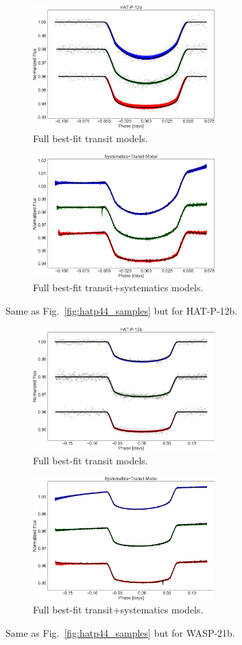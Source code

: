 \begin{figure}
\centering
\begin{subfigure}{.5\textwidth}
\includegraphics[width=7cm]{hatp12/1000_posterior_samples.png}
\caption{Full best-fit transit models.}
\end{subfigure}%
\begin{subfigure}{.5\textwidth}
\includegraphics[width=7cm]{hatp12/transit_with_sys.png}
\caption{Full best-fit transit+systematics models.}
\end{subfigure}
\caption{Same as Fig.~\ref{fig:hatp44_samples} but for HAT-P-12b.}
\label{fig:hatp12_samples}
\end{figure}

\begin{figure}
\centering
\begin{subfigure}{.5\textwidth}
\includegraphics[width=7cm]{wasp21/1000_posterior_samples.png}
\caption{Full best-fit transit models.}
\end{subfigure}%
\begin{subfigure}{.5\textwidth}
\includegraphics[width=7cm]{wasp21/transit_with_sys.png}
\caption{Full best-fit transit+systematics models.}
\end{subfigure}
\caption{Same as Fig.~\ref{fig:hatp44_samples} but for WASP-21b.}
\label{fig:wasp21_samples}
\end{figure}


